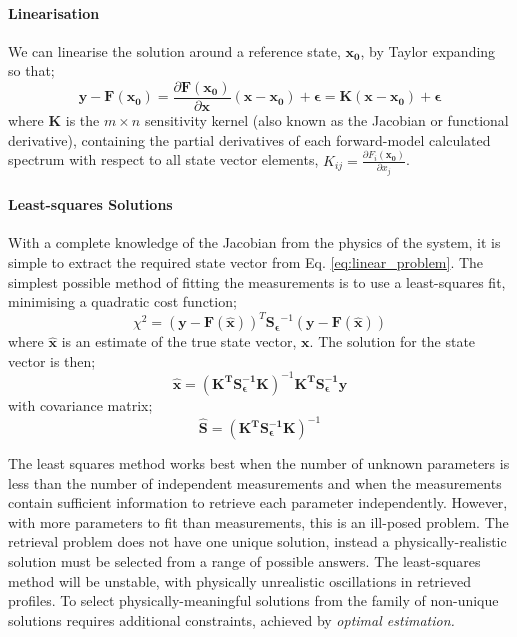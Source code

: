 \documentclass[final,5p,times,twocolumn,authoryear]{elsarticle}
\newcommand{\pderiv}[2]{\frac{\partial #1}{\partial #2}}
\begin{document}
\paragraph{Linearisation}

We can linearise the solution around a reference state, $\mathbf{x_0}$, by Taylor expanding so that;
\begin{equation}
\mathbf{y}-\mathbf{F(x_0)}=\pderiv{\mathbf{F(x_0)}}{\mathbf{x}}(\mathbf{x-x_0})+\mathbf{\epsilon}=\mathbf{K(x-x_0)}+\mathbf{\epsilon}
\label{eq:linear_problem}
\end{equation}
where $\mathbf{K}$ is the $m \times n$ sensitivity kernel (also known as the Jacobian or functional derivative), containing the partial derivatives of each forward-model calculated spectrum with respect to all state vector elements, $K_{ij}=\pderiv{F_i(\mathbf{x_0})}{x_j}$.

\paragraph{Least-squares Solutions}

With a complete knowledge of the Jacobian from the physics of the system, it is simple to extract the required state vector from Eq. \ref{eq:linear_problem}.  The simplest possible method of fitting the measurements is to use a least-squares fit, minimising a quadratic cost function;
\begin{equation}
\chi^2=(\mathbf{y}-\mathbf{F(\hat{x})})^{T}\mathbf{S_\epsilon}^{-1}(\mathbf{y}-\mathbf{F(\hat{x})})
\end{equation}
where $\mathbf{\hat{x}}$ is an estimate of the true state vector, $\mathbf{x}$.  The solution for the state vector \citep{00rodgers} is then;
\begin{equation}
\mathbf{\hat{x}}=\left(\mathbf{K^TS_\epsilon^{-1}K}\right)^{-1}\mathbf{K^TS_\epsilon^{-1}}\mathbf{y}
\label{eq:least_squares}
\end{equation}
with covariance matrix;
\begin{equation}
\mathbf{\hat{S}}=\left(\mathbf{K^TS_\epsilon^{-1}K}\right)^{-1}
\end{equation}

The least squares method works best when the number of unknown parameters is less than the number of independent measurements and when the measurements contain sufficient information to retrieve each parameter independently.  However, with more parameters to fit than measurements, this is an ill-posed problem.  The retrieval problem does not have one unique solution, instead a physically-realistic solution must be selected from a range of possible answers.  The least-squares method will be unstable, with physically unrealistic oscillations in retrieved profiles.  To select physically-meaningful solutions from the family of non-unique solutions requires additional constraints, achieved by \textit{optimal estimation.}
\end{document}
